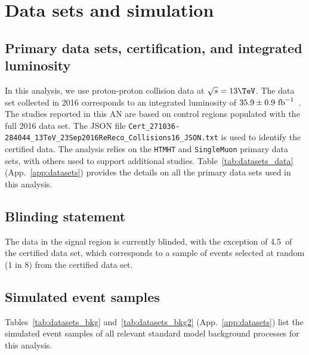 \section{Data sets and simulation}
\label{sec:datasets}

\subsection{Primary data sets, certification, and integrated luminosity}

In this analysis, we use proton-proton collision data at $\sqrt{s} =
13\TeV$. The data set collected in 2016 corresponds to an integrated
luminosity of $35.9 \pm 0.9~\text{fb}^{-1}$~\cite{lumi}. The studies reported in
this AN are based on control regions populated with the full 2016 data
set. The JSON file
\verb!Cert_271036-284044_13TeV_23Sep2016ReReco_Collisions16_JSON.txt!
is used to identify the certified data. The analysis relies on the
\verb!HTMHT! and \verb!SingleMuon! primary data sets, with others used
to support additional studies. Table~\ref{tab:datasets_data}
(App.~\ref{app:datasets}) provides the details on all the primary data
sets used in this analysis.

%   
%

\subsection{Blinding statement}

The data in the signal region is currently blinded, with the exception
of 4.5~\ifb of the certified data set, which corresponds to a sample
of events selected at random (1 in 8) from the certified data set.

\subsection{Simulated event samples}

Tables~\ref{tab:datasets_bkg} and~\ref{tab:datasets_bkg2}
(App.~\ref{app:datasets}) list the simulated event samples of all
relevant standard model background processes for this analysis.

